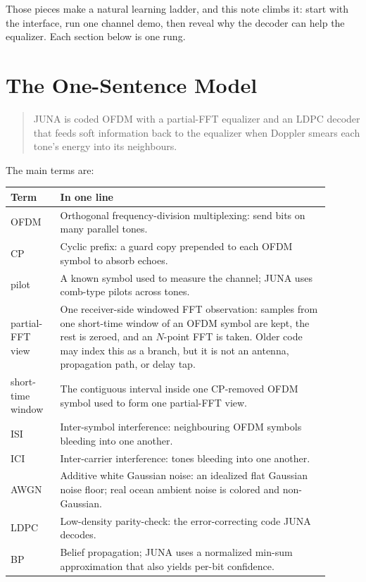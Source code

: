 \documentclass[11pt]{article}
\newcommand{\juna}{JUNA}
\begin{document}
Those pieces make a natural learning ladder, and this note climbs it: start
with the interface, run one channel demo, then reveal why the decoder can help
the equalizer. Each section below is one rung.

\section{The One-Sentence Model}

\begin{quote}
\juna{} is coded OFDM with a partial-FFT equalizer and an LDPC decoder that
feeds soft information back to the equalizer when Doppler smears each tone's
energy into its neighbours.
\end{quote}

The main terms are:
\begin{center}
\begin{tabular}{p{0.14\linewidth}p{0.76\linewidth}}
\toprule
Term & In one line \\
\midrule
OFDM & Orthogonal frequency-division multiplexing: send bits on many parallel tones. \\
CP & Cyclic prefix: a guard copy prepended to each OFDM symbol to absorb echoes. \\
pilot & A known symbol used to measure the channel; \juna{} uses comb-type pilots across tones. \\
partial-FFT view & One receiver-side windowed FFT observation: samples from one short-time window of an OFDM symbol are kept, the rest is zeroed, and an \(N\)-point FFT is taken. Older code may index this as a branch, but it is not an antenna, propagation path, or delay tap. \\
short-time window & The contiguous interval inside one CP-removed OFDM symbol used to form one partial-FFT view. \\
ISI & Inter-symbol interference: neighbouring OFDM symbols bleeding into one another. \\
ICI & Inter-carrier interference: tones bleeding into one another. \\
AWGN & Additive white Gaussian noise: an idealized flat Gaussian noise floor; real ocean ambient noise is colored and non-Gaussian. \\
LDPC & Low-density parity-check: the error-correcting code \juna{} decodes. \\
BP & Belief propagation; \juna{} uses a normalized min-sum approximation that also yields per-bit confidence. \\

\end{tabular}
\end{center}
\end{document}
